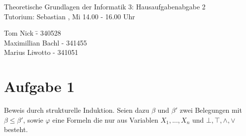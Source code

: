 \documentclass[a4paper,10pt]{article}
\begin{document}
\begin{center}
\Large{Theoretische Grundlagen der Informatik 3: Hausaufgabenabgabe 2} \\
\large{Tutorium: Sebastian , Mi 14.00 - 16.00 Uhr}
\end{center}
\begin{tabbing}
Tom Nick \hspace{2cm}\= - 340528\\
Maximillian Bachl \> - 341455 \\
Marius Liwotto\> -  341051
\end{tabbing}
\section*{Aufgabe 1}
Beweis durch strukturelle Induktion. Seien dazu $\beta$ und $\beta'$ zwei Belegungen mit $\beta \leq \beta'$, sowie $\varphi$ eine Formeln die nur aus Variablen $X_1,...,X_n$ und $\bot,\top,\land,\lor$ besteht.
\end{document}
